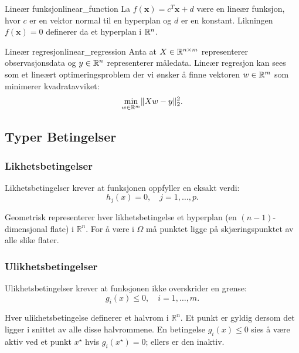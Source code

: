 \begin{example}{Lineær funksjon}{linear_function}
	La \(f(\symbf{x}) = c^T\symbf{x} + d\) være en lineær funksjon, hvor \(c\) er en vektor normal til en hyperplan og \(d\) er en konstant. Likningen \(f(\symbf{x}) = 0\) definerer da et hyperplan i \(\mathbb{R}^n\).
\end{example}

\begin{example}{Lineær regresjon}{linear_regression}
	Anta at \(X \in \mathbb{R}^{n \times m}\) representerer observasjonsdata og \(y \in \mathbb{R}^n\) representerer måledata. Lineær regresjon kan sees som et lineært optimeringsproblem der vi ønsker å finne vektoren \(w \in \mathbb{R}^m\) som minimerer kvadratavviket:
	\begin{equation*}
		\min_{w \in \mathbb{R}^m} \lVert Xw - y\rVert_2^2.
	\end{equation*}
\end{example}

\subsection{Typer Betingelser}

\subsubsection{Likhetsbetingelser}
Likhetsbetingelser krever at funksjonen oppfyller en eksakt verdi:
\begin{equation*}
	h_j(x) = 0, \quad j = 1,\ldots,p.
\end{equation*}

Geometrisk representerer hver likhetsbetingelse et hyperplan (en \((n-1)\)-dimensjonal flate) i \( \mathbb{R}^n \). For å være i \( \Omega \) må punktet ligge på skjæringspunktet av alle slike flater.

\subsubsection{Ulikhetsbetingelser}
Ulikhetsbetingelser krever at funksjonen ikke overskrider en grense:
\begin{equation*}
	g_i(x) \leq 0, \quad i = 1,\ldots,m.
\end{equation*}

Hver ulikhetsbetingelse definerer et halvrom i \( \mathbb{R}^n \). Et punkt er gyldig dersom det ligger i snittet av alle disse halvrommene. En betingelse \( g_i(x) \leq 0 \) sies å være aktiv ved et punkt \( x^\star \) hvis \( g_i(x^\star) = 0 \); ellers er den inaktiv.


